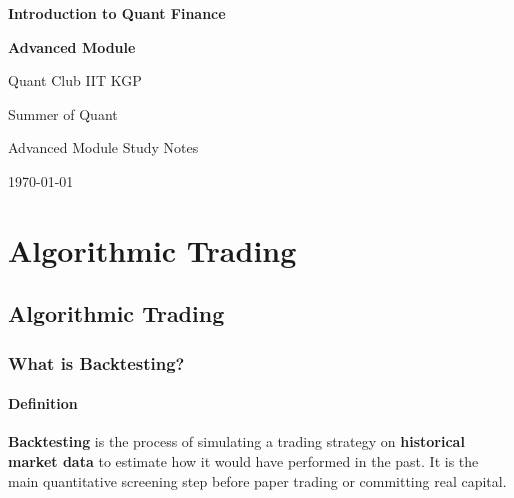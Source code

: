 \documentclass[12pt,openany]{book}
\theoremstyle{definition}
\theoremstyle{remark}
\begin{document}
\begin{titlepage}
    \centering
    \vspace*{2cm}

    {\Huge \textbf{Introduction to Quant Finance}\par}
    \vspace{0.35cm}
    {\LARGE \textbf{Advanced Module}\par}
    \vspace{0.8cm}
    {\Large Quant Club IIT KGP\par}
    \vspace{0.4cm}
    {\Large Summer of Quant\par}

    \vfill

    {\large Advanced Module Study Notes\par}
    \vspace{0.5cm}
    {\large \today\par}

    \vfill
\end{titlepage}


\tableofcontents



\part*{Algorithmic Trading}


\chapter{Algorithmic Trading}

\section{What is Backtesting?}

\subsection{Definition}

\textbf{Backtesting} is the process of simulating a trading strategy on
\textbf{historical market data} to estimate how it would have performed in
the past. It is the main quantitative screening step before paper trading or
committing real capital.
\end{document}
